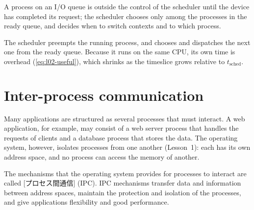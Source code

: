 \documentclass[../main.tex]{subfiles}
\begin{document}
A process on an I/O queue is outside the control of the scheduler until the
device has completed its request; the scheduler chooses only among the
processes in the ready queue, and decides when to switch contexts and to
which process.

\begin{keypoint}
  The scheduler preempts the running process, and chooses and dispatches
  the next one from the ready queue.  Because it runs on the same CPU, its
  own time is overhead (\cref{eq:l02-useful}), which shrinks as the
  timeslice grows relative to $t_{\mathrm{sched}}$.
\end{keypoint}

\section{Inter-process communication}
\label{sec:l02-ipc}

Many applications are structured as several processes that must interact.
A web application, for example, may consist of a web server process that
handles the requests of clients and a database process that stores the
data.
The operating system, however, isolates processes from one another (Lesson~1):
each has its own address space, and no process can access the memory of
another.

\begin{definition}
  The mechanisms that the operating system provides for processes to
  interact are called
  [プロセス間通信]
  (IPC).  IPC mechanisms transfer data and information
  between address spaces, maintain the protection and isolation of the
  processes, and give applications flexibility and good
  performance.
\end{definition}
\end{document}
